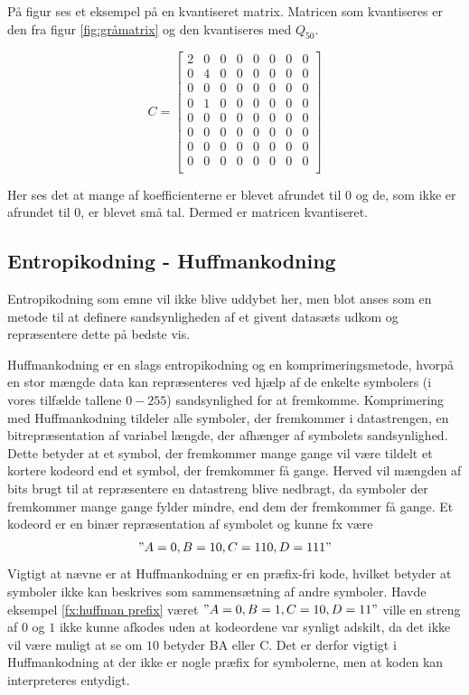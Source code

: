 På figur ses et eksempel på en kvantiseret matrix. Matricen som kvantiseres er den fra figur \vref{fig:gråmatrix} og den kvantiseres med $Q_50$.

\begin{equation}
	C=
\begin{bmatrix}
	2	&	0	& 0		& 0		& 	0	&	0	& 0		& 0	\\
	0	&	4	& 0		& 0		& 	0	& 	0	& 0		& 0	\\
	0	&	0	& 0		& 0		& 	0	& 	0	& 0		& 0	\\
	0	&	1	& 0		& 0		& 	0	& 	0	& 0		& 0	\\
	0	&	0	& 0		& 0		& 	0	& 	0	& 0		& 0	\\
	0	&	0	& 0		& 0		& 	0	& 	0	& 0		& 0	\\
	0	&	0	& 0		& 0		& 	0	& 	0	& 0		& 0	\\
	0	&	0	& 0		& 0		& 	0	& 	0	& 0		& 0	\\
\end{bmatrix}
\end{equation}

Her ses det at mange af koefficienterne er blevet afrundet til 0 og de, som ikke er afrundet til 0, er blevet små tal. Dermed er matricen kvantiseret.

\subsection{Entropikodning - Huffmankodning}
\label{sec:Huffman}
Entropikodning som emne vil ikke blive uddybet her, men blot anses som en metode til at definere sandsynligheden af et givent datasæts udkom og repræsentere dette på bedste vis.

Huffmankodning er en slags entropikodning og en komprimeringsmetode, hvorpå en stor mængde data kan repræsenteres ved hjælp af de enkelte symbolers (i vores tilfælde tallene $0-255$) sandsynlighed for at fremkomme. Komprimering med Huffmankodning tildeler alle symboler, der fremkommer i datastrengen, en bitrepræsentation af variabel længde, der afhænger af symbolets sandsynlighed. Dette betyder at et symbol, der fremkommer mange gange vil være tildelt et kortere kodeord end et symbol, der fremkommer få gange. Herved vil mængden af bits brugt til at repræsentere en datastreng blive nedbragt, da symboler der fremkommer mange gange fylder mindre, end dem der fremkommer få gange. Et kodeord er en binær repræsentation af symbolet og kunne fx være
\begin{align}
"A=0, B=10, C=110, D=111"
\label{fx:huffman prefix}
\end{align}
Vigtigt at nævne er at Huffmankodning er en præfix-fri kode, hvilket betyder at symboler ikke kan beskrives som sammensætning af andre symboler. Havde eksempel \vref{fx:huffman prefix} været $"A=0, B=1, C=10, D=11"$ ville en streng af $0$ og $1$ ikke kunne afkodes uden at kodeordene var synligt adskilt, da det ikke vil være muligt at se om $10$ betyder BA eller C. Det er derfor vigtigt i Huffmankodning at der ikke er nogle præfix for symbolerne, men at koden kan interpreteres entydigt.

